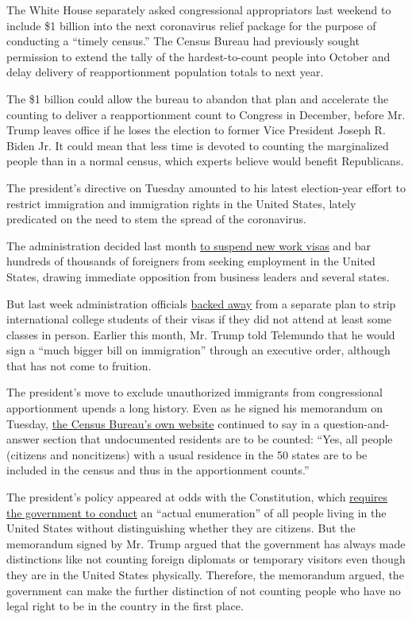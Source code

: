The White House separately asked congressional appropriators last
weekend to include \$1 billion into the next coronavirus relief package
for the purpose of conducting a ``timely census.'' The Census Bureau had
previously sought permission to extend the tally of the hardest-to-count
people into October and delay delivery of reapportionment population
totals to next year.

The \$1 billion could allow the bureau to abandon that plan and
accelerate the counting to deliver a reapportionment count to Congress
in December, before Mr. Trump leaves office if he loses the election to
former Vice President Joseph R. Biden Jr. It could mean that less time
is devoted to counting the marginalized people than in a normal census,
which experts believe would benefit Republicans.

The president's directive on Tuesday amounted to his latest
election-year effort to restrict immigration and immigration rights in
the United States, lately predicated on the need to stem the spread of
the coronavirus.

The administration decided last month
\href{https://www.nytimes.com/2020/06/22/us/politics/trump-h1b-work-visas.html}{to
suspend new work visas} and bar hundreds of thousands of foreigners from
seeking employment in the United States, drawing immediate opposition
from business leaders and several states.

But last week administration officials
\href{https://www.nytimes.com/2020/06/22/us/politics/trump-h1b-work-visas.html}{backed
away} from a separate plan to strip international college students of
their visas if they did not attend at least some classes in person.
Earlier this month, Mr. Trump told Telemundo that he would sign a ``much
bigger bill on immigration'' through an executive order, although that
has not come to fruition.

The president's move to exclude unauthorized immigrants from
congressional apportionment upends a long history. Even as he signed his
memorandum on Tuesday,
\href{https://www.census.gov/population/apportionment/about/faq.html\#Q16}{the
Census Bureau's own website} continued to say in a question-and-answer
section that undocumented residents are to be counted: ``Yes, all people
(citizens and noncitizens) with a usual residence in the 50 states are
to be included in the census and thus in the apportionment counts.''

The president's policy appeared at odds with the Constitution, which
\href{https://www.census.gov/programs-surveys/decennial-census/about/census-constitution.html}{requires
the government to conduct} an ``actual enumeration'' of all people
living in the United States without distinguishing whether they are
citizens. But the memorandum signed by Mr. Trump argued that the
government has always made distinctions like not counting foreign
diplomats or temporary visitors even though they are in the United
States physically. Therefore, the memorandum argued, the government can
make the further distinction of not counting people who have no legal
right to be in the country in the first place.

